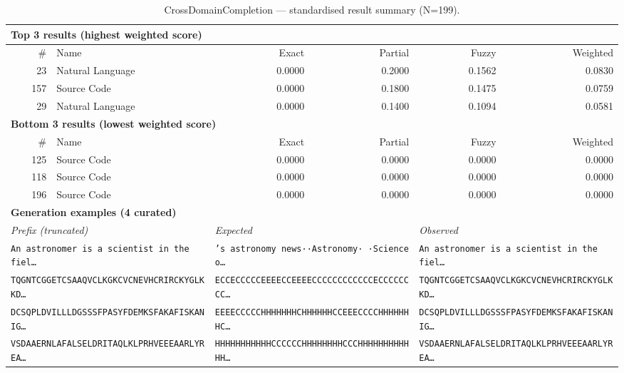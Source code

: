 \begin{table}[htbp]
\centering
\caption{CrossDomainCompletion — standardised result summary (N=199).}
\label{tab:crossdomaincompletion_summary}
\begin{adjustbox}{max width=\textwidth}
\begin{tabular}{r p{5cm} r r r r}
\toprule
\multicolumn{6}{l}{\textbf{Top 3 results (highest weighted score)}} \\
\midrule
\# & Name & Exact & Partial & Fuzzy & Weighted \\
\midrule
23 & Natural Language & 0.0000 & 0.2000 & 0.1562 & 0.0830 \\
157 & Source Code & 0.0000 & 0.1800 & 0.1475 & 0.0759 \\
29 & Natural Language & 0.0000 & 0.1400 & 0.1094 & 0.0581 \\
\midrule
\multicolumn{6}{l}{\textbf{Bottom 3 results (lowest weighted score)}} \\
\midrule
\# & Name & Exact & Partial & Fuzzy & Weighted \\
\midrule
125 & Source Code & 0.0000 & 0.0000 & 0.0000 & 0.0000 \\
118 & Source Code & 0.0000 & 0.0000 & 0.0000 & 0.0000 \\
196 & Source Code & 0.0000 & 0.0000 & 0.0000 & 0.0000 \\
\midrule
\multicolumn{6}{l}{\textbf{Generation examples (4 curated)}} \\
\midrule
\multicolumn{2}{l}{\textit{Prefix (truncated)}} & \multicolumn{2}{l}{\textit{Expected}} & \multicolumn{2}{l}{\textit{Observed}} \\
\midrule
\multicolumn{2}{l}{\texttt{An astronomer is a scientist in the fiel\ldots}} & \multicolumn{2}{l}{\texttt{'s astronomy news··Astronomy· ·Science o\ldots}} & \multicolumn{2}{l}{\texttt{An astronomer is a scientist in the fiel\ldots}} \\
\multicolumn{2}{l}{\texttt{TQGNTCGGETCSAAQVCLKGKCVCNEVHCRIRCKYGLKKD\ldots}} & \multicolumn{2}{l}{\texttt{ECCECCCCCEEEECCEEEECCCCCCCCCCCCECCCCCCCC\ldots}} & \multicolumn{2}{l}{\texttt{TQGNTCGGETCSAAQVCLKGKCVCNEVHCRIRCKYGLKKD\ldots}} \\
\multicolumn{2}{l}{\texttt{DCSQPLDVILLLDGSSSFPASYFDEMKSFAKAFISKANIG\ldots}} & \multicolumn{2}{l}{\texttt{EEEECCCCCHHHHHHHCHHHHHHCCEEECCCCHHHHHHHC\ldots}} & \multicolumn{2}{l}{\texttt{DCSQPLDVILLLDGSSSFPASYFDEMKSFAKAFISKANIG\ldots}} \\
\multicolumn{2}{l}{\texttt{VSDAAERNLAFALSELDRITAQLKLPRHVEEEAARLYREA\ldots}} & \multicolumn{2}{l}{\texttt{HHHHHHHHHHHCCCCCCHHHHHHHHCCCHHHHHHHHHHHH\ldots}} & \multicolumn{2}{l}{\texttt{VSDAAERNLAFALSELDRITAQLKLPRHVEEEAARLYREA\ldots}} \\

\end{tabular}
\end{adjustbox}
\end{table}
